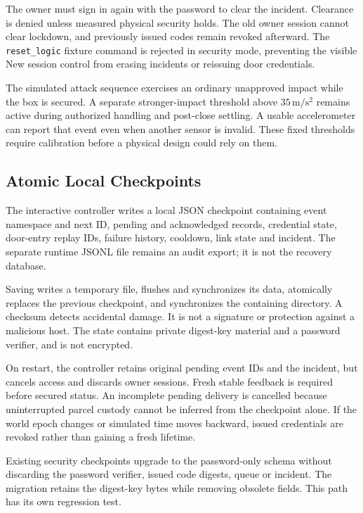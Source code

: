 \documentclass[conference,letterpaper]{IEEEtran}
\newcommand{\code}[1]{\texttt{\small #1}}
\begin{document}
The owner must sign in again with the password to clear the incident. Clearance is denied unless measured physical security holds. The old owner session cannot clear lockdown, and previously issued codes remain revoked afterward. The \code{reset\_logic} fixture command is rejected in security mode, preventing the visible New session control from erasing incidents or reissuing door credentials.

The simulated attack sequence exercises an ordinary unapproved impact while the box is secured. A separate stronger-impact threshold above $35\,\mathrm{m/s^2}$ remains active during authorized handling and post-close settling. A usable accelerometer can report that event even when another sensor is invalid. These fixed thresholds require calibration before a physical design could rely on them.

\subsection{Atomic Local Checkpoints}
The interactive controller writes a local JSON checkpoint containing event namespace and next ID, pending and acknowledged records, credential state, door-entry replay IDs, failure history, cooldown, link state and incident. The separate runtime JSONL file remains an audit export; it is not the recovery database.

Saving writes a temporary file, flushes and synchronizes its data, atomically replaces the previous checkpoint, and synchronizes the containing directory. A checksum detects accidental damage. It is not a signature or protection against a malicious host. The state contains private digest-key material and a password verifier, and is not encrypted.

On restart, the controller retains original pending event IDs and the incident, but cancels access and discards owner sessions. Fresh stable feedback is required before secured status. An incomplete pending delivery is cancelled because uninterrupted parcel custody cannot be inferred from the checkpoint alone. If the world epoch changes or simulated time moves backward, issued credentials are revoked rather than gaining a fresh lifetime.

Existing security checkpoints upgrade to the password-only schema without discarding the password verifier, issued code digests, queue or incident. The migration retains the digest-key bytes while removing obsolete fields. This path has its own regression test.
\end{document}
